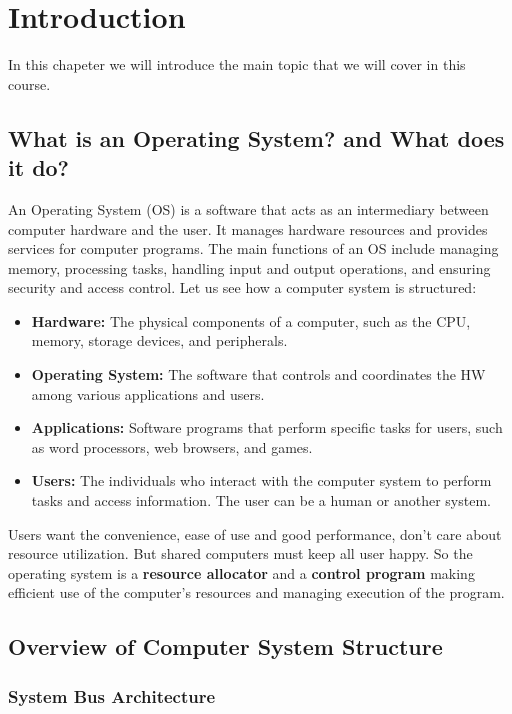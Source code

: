 \chapter{Introduction}


    In this chapeter we will introduce the main topic that we will cover in this course.


\section{What is an Operating System? and What does it do?}

    An Operating System (OS) is a software that acts as an intermediary between computer hardware and the user. It manages hardware resources and provides services for computer programs. The main functions of an OS include managing memory, processing tasks, handling input and output operations, and ensuring security and access control.
    Let us see how a computer system is structured:
        \begin{itemize}
            \item \textbf{Hardware:} The physical components of a computer, such as the CPU, memory, storage devices, and peripherals.
            \item \textbf{Operating System:} The software that controls and coordinates the HW among various applications and users.
            \item \textbf{Applications:} Software programs that perform specific tasks for users, such as word processors, web browsers, and games.
            \item \textbf{Users:} The individuals who interact with the computer system to perform tasks and access information. The user can be a human or another system.
        \end{itemize}
    
    Users want the convenience, ease of use and good performance, don't care about resource utilization.
    But shared computers must keep all user happy. So the operating system is a \textbf{resource allocator} and a \textbf{control program} making efficient use of the computer's resources and managing execution of the program.


\section{Overview of Computer System Structure} 

    \subsection{System Bus Architecture}
    
